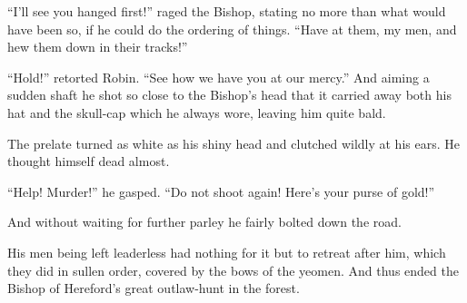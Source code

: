 ``I'll see you hanged first!'' raged the Bishop, stating no more than
what would have been so, if he could do the ordering of things. ``Have
at them, my men, and hew them down in their tracks!''

``Hold!'' retorted Robin. ``See how we have you at our mercy.'' And
aiming a sudden shaft he shot so close to the Bishop's head that it
carried away both his hat and the skull-cap which he always wore,
leaving him quite bald.

The prelate turned as white as his shiny head and clutched wildly at his
ears. He thought himself dead almost.

``Help! Murder!'' he gasped. ``Do not shoot again! Here's your purse of
gold!''

And without waiting for further parley he fairly bolted down the road.

His men being left leaderless had nothing for it but to retreat after
him, which they did in sullen order, covered by the bows of the yeomen.
And thus ended the Bishop of Hereford's great outlaw-hunt in the forest.
